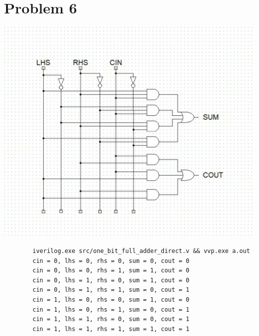 \documentclass{article}
\newenvironment{problem}[1]{
  \nobreak\section*{Problem #1}
}{}
\begin{document}
\begin{problem}{6}
    \begin{center}
      \includegraphics[scale=0.6]{images/one_bit_full_adder_direct.jpg}
    \end{center}

    \begin{center}
      \begin{lstlisting}
        iverilog.exe src/one_bit_full_adder_direct.v && vvp.exe a.out
        cin = 0, lhs = 0, rhs = 0, sum = 0, cout = 0
        cin = 0, lhs = 0, rhs = 1, sum = 1, cout = 0
        cin = 0, lhs = 1, rhs = 0, sum = 1, cout = 0
        cin = 0, lhs = 1, rhs = 1, sum = 0, cout = 1
        cin = 1, lhs = 0, rhs = 0, sum = 1, cout = 0
        cin = 1, lhs = 0, rhs = 1, sum = 0, cout = 1
        cin = 1, lhs = 1, rhs = 0, sum = 0, cout = 1
        cin = 1, lhs = 1, rhs = 1, sum = 1, cout = 1
      \end{lstlisting}
    \end{center}
  \end{problem}
\end{document}
